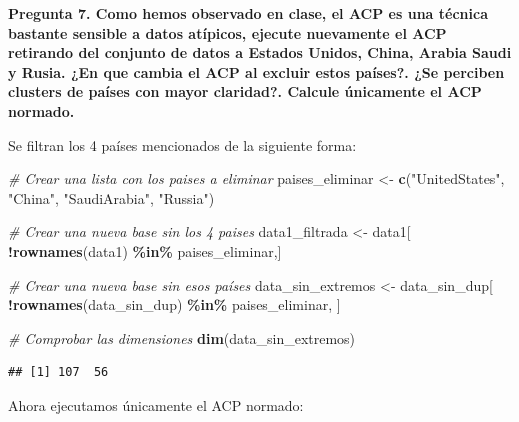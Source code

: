 \documentclass[
]{article}
\newenvironment{Shaded}{\begin{snugshade}}{\end{snugshade}}
\newcommand{\AttributeTok}[1]{\textcolor[rgb]{0.13,0.29,0.53}{#1}}
\newcommand{\CommentTok}[1]{\textcolor[rgb]{0.56,0.35,0.01}{\textit{#1}}}
\newcommand{\ConstantTok}[1]{\textcolor[rgb]{0.56,0.35,0.01}{#1}}
\newcommand{\DecValTok}[1]{\textcolor[rgb]{0.00,0.00,0.81}{#1}}
\newcommand{\FunctionTok}[1]{\textcolor[rgb]{0.13,0.29,0.53}{\textbf{#1}}}
\newcommand{\NormalTok}[1]{#1}
\newcommand{\OtherTok}[1]{\textcolor[rgb]{0.56,0.35,0.01}{#1}}
\newcommand{\SpecialCharTok}[1]{\textcolor[rgb]{0.81,0.36,0.00}{\textbf{#1}}}
\newcommand{\StringTok}[1]{\textcolor[rgb]{0.31,0.60,0.02}{#1}}
\begin{document}
\noindent\textbf{Pregunta 7. Como hemos observado en clase, el ACP es una técnica bastante sensible a datos atípicos, ejecute nuevamente el ACP retirando del conjunto de datos a Estados Unidos, China, Arabia Saudi y Rusia. ¿En que cambia el ACP al excluir estos países?. ¿Se perciben clusters de países con mayor claridad?. Calcule únicamente el ACP normado.}

Se filtran los 4 países mencionados de la siguiente forma:

\begin{Shaded}
\begin{Highlighting}[]
\CommentTok{\# Crear una lista con los paises a eliminar}
\NormalTok{paises\_eliminar }\OtherTok{\textless{}{-}} \FunctionTok{c}\NormalTok{(}\StringTok{"UnitedStates"}\NormalTok{, }\StringTok{"China"}\NormalTok{, }
                     \StringTok{"SaudiArabia"}\NormalTok{, }\StringTok{"Russia"}\NormalTok{)}

\CommentTok{\# Crear una nueva base sin los 4 paises }
\NormalTok{data1\_filtrada }\OtherTok{\textless{}{-}}\NormalTok{ data1[}
  \SpecialCharTok{!}\FunctionTok{rownames}\NormalTok{(data1) }\SpecialCharTok{\%in\%}\NormalTok{ paises\_eliminar,]}

\CommentTok{\# Crear una nueva base sin esos países}
\NormalTok{data\_sin\_extremos }\OtherTok{\textless{}{-}}\NormalTok{ data\_sin\_dup[}
  \SpecialCharTok{!}\FunctionTok{rownames}\NormalTok{(data\_sin\_dup) }\SpecialCharTok{\%in\%}\NormalTok{ paises\_eliminar,}
\NormalTok{]}

\CommentTok{\# Comprobar las dimensiones}
\FunctionTok{dim}\NormalTok{(data\_sin\_extremos)}
\end{Highlighting}
\end{Shaded}

\begin{verbatim}
## [1] 107  56
\end{verbatim}

Ahora ejecutamos únicamente el ACP normado:

\begin{Shaded}
\end{Shaded}
\end{document}
